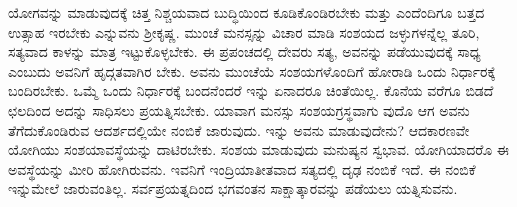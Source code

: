 ಯೋಗವನ್ನು ಮಾಡುವುದಕ್ಕೆ ಚಿತ್ತ ನಿಶ್ಚಯವಾದ ಬುದ್ಧಿಯಿಂದ ಕೂಡಿಕೊಂಡಿರಬೇಕು ಮತ್ತು ಎಂದೆಂದಿಗೂ ಬತ್ತದ ಉತ್ಸಾಹ ಇರಬೇಕು ಎನ್ನುವನು ಶ್ರೀಕೃಷ್ಣ. ಮುಂಚೆ ಮನಸ್ಸನ್ನು ವಿಚಾರ ಮಾಡಿ ಸಂಶಯದ ಜಳ್ಳುಗಳನ್ನೆಲ್ಲ ತೂರಿ, ಸತ್ಯವಾದ ಕಾಳನ್ನು ಮಾತ್ರ ಇಟ್ಟುಕೊಳ್ಳಬೇಕು. ಈ ಪ್ರಪಂಚದಲ್ಲಿ ದೇವರು ಸತ್ಯ, ಅವನನ್ನು ಪಡೆಯುವುದಕ್ಕೆ ಸಾಧ್ಯ ಎಂಬುದು ಅವನಿಗೆ ಹೃದ್ಗತವಾಗಿರ ಬೇಕು. ಅವನು ಮುಂಚೆಯೆ ಸಂಶಯಗಳೊಂದಿಗೆ ಹೋರಾಡಿ ಒಂದು ನಿರ್ಧಾರಕ್ಕೆ ಬಂದಿರಬೇಕು. ಒಮ್ಮೆ ಒಂದು ನಿರ್ಧಾರಕ್ಕೆ ಬಂದನೆಂದರೆ ಇನ್ನು ಏನಾದರೂ ಚಿಂತೆಯಿಲ್ಲ. ಕೊನೆಯ ವರೆಗೂ ಬಿಡದೆ ಛಲದಿಂದ ಅದನ್ನು ಸಾಧಿಸಲು ಪ್ರಯತ್ನಿಸಬೇಕು. ಯಾವಾಗ ಮನಸ್ಸು ಸಂಶಯಗ್ರಸ್ಥವಾಗು ವುದೊ ಆಗ ಅವನು ತೆಗೆದುಕೊಂಡಿರುವ ಆದರ್ಶದಲ್ಲಿಯೇ ನಂಬಿಕೆ ಜಾರುವುದು. ಇನ್ನು ಅವನು ಮಾಡುವುದೇನು? ಆದಕಾರಣವೇ ಯೋಗಿಯು ಸಂಶಯಾವಸ್ಥೆಯನ್ನು ದಾಟಿರಬೇಕು. ಸಂಶಯ ಮಾಡುವುದು ಮನುಷ್ಯನ ಸ್ವಭಾವ. ಯೋಗಿಯಾದರೊ ಈ ಅವಸ್ಥೆಯನ್ನು ಮೀರಿ ಹೋಗಿರುವನು. ಇವನಿಗೆ ಇಂದ್ರಿಯಾತೀತವಾದ ಸತ್ಯದಲ್ಲಿ ದೃಢ ನಂಬಿಕೆ ಇದೆ. ಈ ನಂಬಿಕೆ ಇನ್ನುಮೇಲೆ ಜಾರುವಂತಿಲ್ಲ. ಸರ್ವಪ್ರಯತ್ನದಿಂದ ಭಗವಂತನ ಸಾಕ್ಷಾತ್ಕಾರವನ್ನು ಪಡೆಯಲು ಯತ್ನಿಸುವನು.

